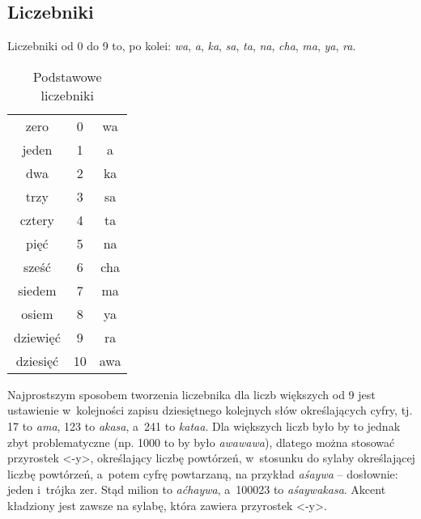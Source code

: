 \begin{spacing}{1.1}




\subsection{Liczebniki}

Liczebniki od 0 do 9 to, po kolei: \emph{wa}, \emph{a}, \emph{ka}, \emph{sa}, 
\emph{ta}, \emph{na}, \emph{cha}, \emph{ma}, \emph{ya}, \emph{ra}.

\begin{table}[ht]
	\centering
	\caption{Podstawowe liczebniki}
	\begin{tabular}{ccc} \toprule
		zero & 0 & wa \\
		jeden & 1 & a \\
		dwa & 2 & ka \\
		trzy & 3 & sa \\
		cztery & 4 & ta \\
		pięć & 5 & na \\
		sześć & 6 & cha \\
		siedem & 7 & ma \\
		osiem & 8 & ya \\
		dziewięć & 9 & ra \\
		dziesięć & 10 & awa \\\bottomrule
	\end{tabular}
	\label{tab:numerals}
\end{table}

Najprostszym sposobem tworzenia liczebnika dla liczb większych od 9 jest
ustawienie w~kolejności zapisu dziesiętnego kolejnych słów określających cyfry,
tj. 17 to \emph{ama}, 123 to \emph{akasa}, a~241 to \emph{kataa}. Dla większych
liczb było by to jednak zbyt problematyczne (np. 1000 to by było
\emph{awawawa}), dlatego można stosować przyrostek <-y>, określający liczbę
powtórzeń, w~stosunku do sylaby określającej liczbę powtórzeń, a~potem cyfrę
powtarzaną, na przykład \emph{aśaywa} -- dosłownie: jeden i~trójka zer. Stąd
milion to \emph{aćhaywa}, a~100023 to \emph{aśaywakasa}. Akcent kładziony jest
zawsze na sylabę, która zawiera przyrostek <-y>.


\end{spacing}
